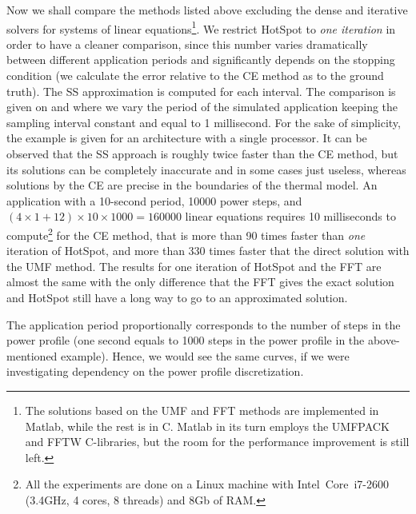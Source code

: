 Now we shall compare the methods listed above excluding the dense and iterative solvers for systems of linear equations\footnote{The solutions based on the UMF and FFT methods are implemented in Matlab, while the rest is in C. Matlab in its turn employs the UMFPACK and FFTW C-libraries, but the room for the performance improvement is still left.}. We restrict HotSpot to \emph{one iteration} in order to have a cleaner comparison, since this number varies dramatically between different application periods and significantly depends on the stopping condition (we calculate the error relative to the CE method as to the ground truth). The SS approximation is computed for each interval. The comparison is given on  and  where we vary the period of the simulated application keeping the sampling interval constant and equal to 1 millisecond. For the sake of simplicity, the example is given for an architecture with a single processor. It can be observed that the SS approach is roughly twice faster than the CE method, but its solutions can be completely inaccurate and in some cases just useless, whereas solutions by the CE are precise in the boundaries of the thermal model. An application with a 10-second period, 10000 power steps, and $(4 \times 1 + 12) \times 10 \times 1000 = 160000$ linear equations requires 10 milliseconds to compute\footnote{All the experiments are done on a Linux machine with Intel\textregistered\ Core\texttrademark\ i7-2600 (3.4GHz, 4 cores, 8 threads) and 8Gb of RAM.} for the CE method, that is more than 90 times faster than \emph{one} iteration of HotSpot, and more than 330 times faster that the direct solution with the UMF method. The results for one iteration of HotSpot and the FFT are almost the same with the only difference that the FFT gives the exact solution and HotSpot still have a long way to go to an approximated solution.

The application period proportionally corresponds to the number of steps in the power profile (one second equals to 1000 steps in the power profile in the above-mentioned example). Hence, we would see the same curves, if we were investigating dependency on the power profile discretization.

